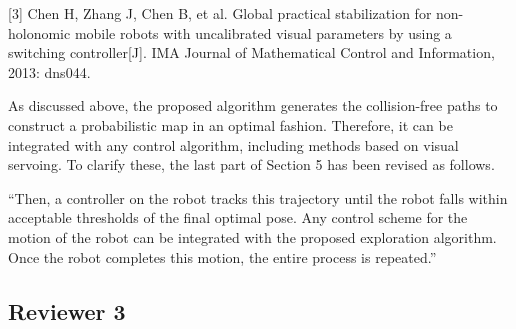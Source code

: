 \documentclass[11pt]{article}
\newenvironment{correction}{\begin{list}{}{\setlength{\leftmargin}{1cm}\setlength{\rightmargin}{1cm}}\vspace{\parsep}\item[]``}{''\end{list}}
\begin{document}
\begin{enumerate}
{[3] Chen H, Zhang J, Chen B, et al. Global practical stabilization for non-holonomic mobile robots with uncalibrated visual parameters by using a switching controller[J]. IMA Journal of Mathematical Control and Information, 2013: dns044.}


As discussed above, the proposed algorithm generates the collision-free paths to construct a probabilistic map in an optimal fashion. Therefore, it can be integrated with any control algorithm, including methods based on visual servoing. To clarify these, the last part of Section 5 has been revised as follows. 


\begin{correction}Then, a controller on the robot tracks this trajectory until the robot falls within acceptable thresholds of the final optimal pose. Any control scheme for the motion of the robot can be integrated with the proposed exploration algorithm. Once the robot completes this motion, the entire process is repeated.\end{correction}

\end{enumerate}







\clearpage\newpage
\subsection*{Reviewer 3}
\end{document}

